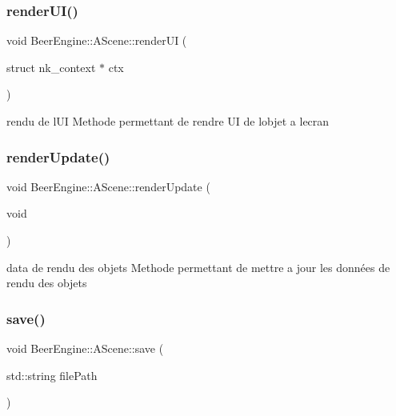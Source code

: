 \subsubsection{\texorpdfstring{render\+U\+I()}{renderUI()}}
{\footnotesize\ttfamily void Beer\+Engine\+::\+A\+Scene\+::render\+UI (\begin{DoxyParamCaption}\item[{struct nk\+\_\+context $\ast$}]{ctx }\end{DoxyParamCaption})}



rendu de l\textquotesingle{}UI Methode permettant de rendre UI de l\textquotesingle{}objet a l\textquotesingle{}ecran 

\mbox{\label{class_beer_engine_1_1_a_scene_accb108fe6723d99c36a85eb51a25820e}} 
\subsubsection{\texorpdfstring{render\+Update()}{renderUpdate()}}
{\footnotesize\ttfamily void Beer\+Engine\+::\+A\+Scene\+::render\+Update (\begin{DoxyParamCaption}\item[{void}]{ }\end{DoxyParamCaption})}



data de rendu des objets Methode permettant de mettre a jour les données de rendu des objets 

\mbox{\label{class_beer_engine_1_1_a_scene_a65e03ade02de4673cd25544d4843c6d8}} 
\subsubsection{\texorpdfstring{save()}{save()}}
{\footnotesize\ttfamily void Beer\+Engine\+::\+A\+Scene\+::save (\begin{DoxyParamCaption}\item[{std\+::string}]{file\+Path }\end{DoxyParamCaption})}

